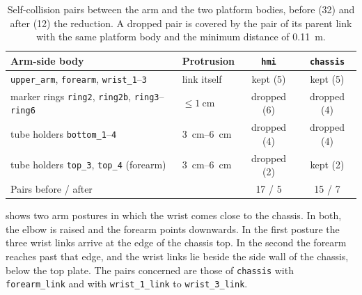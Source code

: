\begin{table}[htbp]
  \centering
  \caption[Self-collision pairs before and after the reduction]{%
    Self-collision pairs between the arm and the two platform bodies,
    before (32) and after (12) the reduction. A dropped pair is covered
    by the pair of its parent link with the same platform body and the
    minimum distance of \qty{0.11}{\meter}.}
  \label{tab:collision-pairs}
  \begin{tabularx}{\linewidth}{@{}Xlcc@{}}
    \toprule
    Arm-side body & Protrusion & \texttt{hmi} & \texttt{chassis} \\
    \midrule
    \texttt{upper\_arm}, \texttt{forearm}, \texttt{wrist\_1}--\texttt{3}
      & link itself & kept (5) & kept (5) \\
    marker rings \texttt{ring2}, \texttt{ring2b}, \texttt{ring3}--\texttt{ring6}
      & $\le \qty{1}{\centi\meter}$ & dropped (6) & dropped (4) \\
    tube holders \texttt{bottom\_1}--\texttt{4}
      & \qtyrange{3}{6}{\centi\meter} & dropped (4) & dropped (4) \\
    tube holders \texttt{top\_3}, \texttt{top\_4} (forearm)
      & \qtyrange{3}{6}{\centi\meter} & dropped (2) & kept (2) \\
    \midrule
    Pairs before / after & & 17 / 5 & 15 / 7 \\
    \bottomrule
  \end{tabularx}
\end{table}

 shows two arm postures in which the
wrist comes close to the chassis. In both, the elbow is raised and the
forearm points downwards. In the first posture the three wrist links
arrive at the edge of the chassis top. In the second the forearm reaches
past that edge, and the wrist links lie beside the side wall of the
chassis, below the top plate. The pairs concerned are those of
\texttt{chassis} with \texttt{forearm\_link} and with
\texttt{wrist\_1\_link} to \texttt{wrist\_3\_link}.

